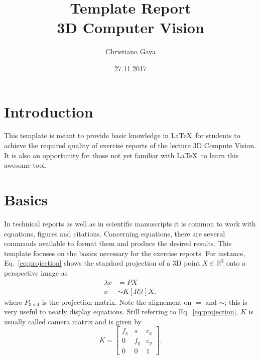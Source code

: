 \documentclass[a4paper, twoside, english]{article}
\title{Template Report \\ 3D Computer Vision}  %
\author{Christiano Gava}                       %
\date{27.11.2017}                              %
\begin{document}
\maketitle

\section{Introduction}

This template is meant to provide basic knowledge in \LaTeX\ for students to achieve the required quality of exercise reports of the lecture 3D Compute Vision.
It is also an opportunity for those not yet familiar with \LaTeX\ to learn this awesome tool.

\section{Basics}

In technical reports as well as in scientific manuscripts it is common to work with equations, figures and citations.
Concerning equations, there are several commands available to format them and produce the desired results.
This template focuses on the basics necessary for the exercise reports.
For instance, Eq.~\ref{eq:projection} shows the standard projection of a 3D point $X \in \mathbb{R}^3$ onto a perspective image as
\begin{equation}
 \begin{aligned}
  \lambda x &= P X \\
          x &\sim K \left[ R | t \right] X,
 \end{aligned}
 \label{eq:projection}
\end{equation}
where $P_{3 \times 4}$ is the projection matrix.
Note the alignement on $=$ and $\sim$; this is very useful to neatly display equations.
Still referring to Eq.~\ref{eq:projection}, $K$ is usually called camera matrix and is given by
\begin{equation*}
 K = \left[
 \begin{array}{ccc}
  f_x & s & c_x \\
  0 & f_y & c_y \\
  0 & 0 & 1
 \end{array}
 \right].
 \label{eq:kmatrix}
\end{equation*}
\end{document}
